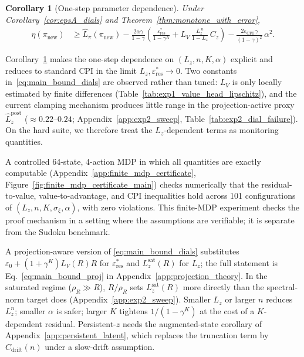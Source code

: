 \documentclass{article}
\theoremstyle{plain}
\newtheorem{corollary}[theorem]{Corollary}
\theoremstyle{definition}
\theoremstyle{remark}
\begin{document}
\begin{corollary}[One-step parameter dependence]
\label{cor:cpi_dials_main}
Under Corollary~\ref{cor:epsA_dials} and Theorem~\ref{thm:monotone_with_error},
\begin{align}
\eta(\pi_{\mathrm{new}})
&\ge
\widehat{L}_\pi(\pi_{\mathrm{new}})
-
\frac{2\alpha\gamma}{1-\gamma}
\left(
\frac{\varepsilon_{\mathrm{res}}^*}{1-\gamma^K}
+
L_V\,\frac{L_z^{\,n}}{1-L_z}\,C_z
\right)
-
\frac{2\varepsilon_{\mathrm{CPI}}\,\gamma}{(1-\gamma)^2}\,\alpha^2.
\label{eq:main_bound_dials}
\end{align}
\end{corollary}

Corollary~\ref{cor:cpi_dials_main} makes the one-step dependence on $(L_z,n,K,\alpha)$ explicit and reduces to standard CPI in the limit $L_z,\varepsilon_{\mathrm{res}}^*\to 0$. Two constants in~\eqref{eq:main_bound_dials} are observed rather than tuned: $L_V$ is only locally estimated by finite differences (Table~\ref{tab:exp1_value_head_lipschitz}), and the current clamping mechanism produces little range in the projection-active proxy $\hat L_z^{\mathrm{post}}$ ($\approx0.22$--$0.24$; Appendix~\ref{app:exp2_sweep}, Table~\ref{tab:exp2_dial_failure}). On the hard suite, we therefore treat the $L_z$-dependent terms as monitoring quantities.

A controlled 64-state, 4-action MDP in which all quantities are exactly computable (Appendix~\ref{app:finite_mdp_certificate}, Figure~\ref{fig:finite_mdp_certificate_main}) checks numerically that the residual-to-value, value-to-advantage, and CPI inequalities hold across 101 configurations of $(L_z,n,K,\sigma_\xi,\alpha)$, with zero violations. This finite-MDP experiment checks the proof mechanism in a setting where the assumptions are verifiable; it is separate from the Sudoku benchmark.

A projection-aware version of \eqref{eq:main_bound_dials} substitutes $\varepsilon_0+(1+\gamma^K)L_V(R)R$ for $\varepsilon_{\mathrm{res}}^*$ and $L_z^{\mathrm{sat}}(R)$ for $L_z$; the full statement is Eq.~\eqref{eq:main_bound_proj} in Appendix~\ref{app:projection_theory}. In the saturated regime ($\rho_R\gg R$), $R/\rho_R$ sets $L_z^{\mathrm{sat}}(R)$ more directly than the spectral-norm target does (Appendix~\ref{app:exp2_sweep}). Smaller $L_z$ or larger $n$ reduces $L_z^n$; smaller $\alpha$ is safer; larger $K$ tightens $1/(1-\gamma^K)$ at the cost of a $K$-dependent residual. Persistent-$z$ needs the augmented-state corollary of Appendix~\ref{app:persistent_latent}, which replaces the truncation term by $C_{\mathrm{drift}}(n)$ under a slow-drift assumption.
\end{document}
